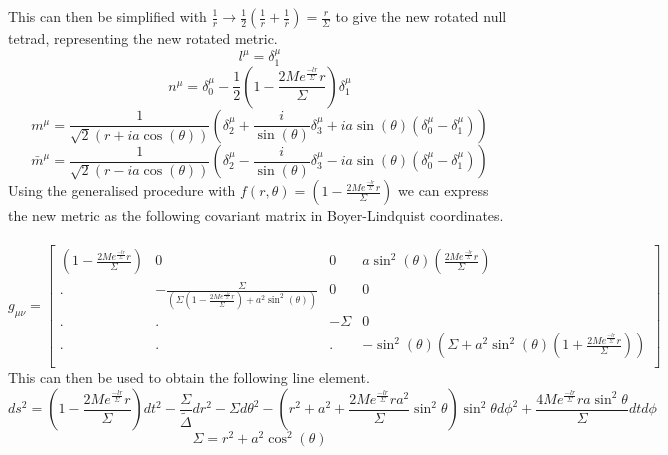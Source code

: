 \documentclass[12pt]{iopart}
\begin{document}
 This can then be simplified with $\frac{1}{r} \rightarrow \frac{1}{2}(\frac{1}{r}+\frac{1}{\bar{r}}) = \frac{r}{\Sigma}$ to give the new rotated null tetrad, representing the new rotated metric. 
 \begin{equation} 
 l^{\mu}=\delta^{\mu}_1
 \end{equation}
 \begin{equation} 
 n^{\mu}=\delta^{\mu}_0-\frac{1}{2}(1-\frac{2Me^{\frac{-lr}{\Sigma}}r}{\Sigma})\delta^{\mu}_1
 \end{equation}
 \begin{equation}
 m^{\mu}=\frac{1}{\sqrt{2}(r+ia\cos(\theta))}(\delta^{\mu}_2+\frac{i}{\sin(\theta)}\delta^{\mu}_3+ia\sin(\theta)(\delta^{\mu}_0-\delta^{\mu}_1))
 \end{equation}
 \begin{equation}
 \bar{m}^{\mu}=\frac{1}{\sqrt{2}(r-ia\cos(\theta))}(\delta^{\mu}_2-\frac{i}{\sin(\theta)}\delta^{\mu}_3-ia\sin(\theta)(\delta^{\mu}_0-\delta^{\mu}_1))
 \end{equation}
Using the generalised procedure with $f(r,\theta ) =  (1-\frac{2Me^{\frac{-lr}{\Sigma}}r}{\Sigma})$ we can express the new metric as the following covariant matrix in Boyer-Lindquist coordinates.
\\
\\
\[
g_{\mu \nu}=
  \left[ {\begin{array}{ccccc}
 (1-\frac{2Me^{\frac{-lr}{\Sigma}}r}{\Sigma}) & 0 & 0 & a\sin^2(\theta)(\frac{2Me^{\frac{-lr}{\Sigma}}r}{\Sigma})\\
 . & -\frac{\Sigma}{(\Sigma (1-\frac{2Me^{\frac{-lr}{\Sigma}}r}{\Sigma})+a^2\sin^2(\theta))} & 0 & 0\\
 . & . & -\Sigma & 0\\
 . & . & . & -\sin^2(\theta)(\Sigma+a^2\sin^2(\theta)(1+\frac{2Me^{\frac{-lr}{\Sigma}}r}{\Sigma}))\\
  \end{array} } \right]
\]
This can then be used to obtain the following line element.
\begin{equation}
ds^{2}=(1-{\frac {2Me^{\frac{-lr}{\Sigma}}r}{\Sigma }})dt^{2} - {\frac {\Sigma }{\tilde{\Delta} }}dr^{2}- \Sigma d\theta ^{2} - (r^{2}+a^{2}+{\frac {2Me^{\frac{-lr}{\Sigma}}ra^{2}}{\Sigma }}\sin ^{2}\theta)\sin ^{2}\theta d\phi ^{2} + {\frac {4Me^{\frac{-lr}{\Sigma}}ra\sin ^{2}\theta }{\Sigma }}dt d\phi 
 \end{equation}
 \begin{equation}
 \Sigma = r^2+a^2\cos^2(\theta)
 \end{equation}
\end{document}
